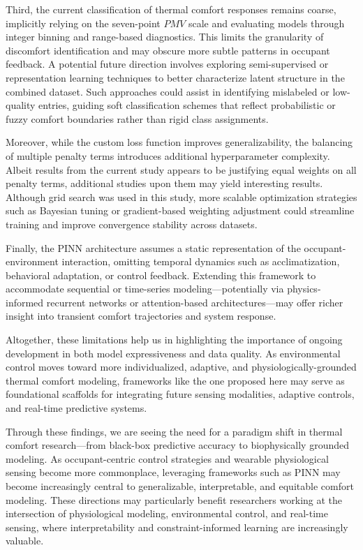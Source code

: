 Third, the current classification of thermal comfort responses remains coarse, implicitly relying on the seven-point $PMV$ scale and evaluating models through integer binning and range-based diagnostics. This limits the granularity of discomfort identification and may obscure more subtle patterns in occupant feedback. A potential future direction involves exploring semi-supervised or representation learning techniques to better characterize latent structure in the combined dataset. Such approaches could assist in identifying mislabeled or low-quality entries, guiding soft classification schemes that reflect probabilistic or fuzzy comfort boundaries rather than rigid class assignments.

Moreover, while the custom loss function improves generalizability, the balancing of multiple penalty terms introduces additional hyperparameter complexity. Albeit results from the current study appears to be justifying equal weights on all penalty terms, additional studies upon them may yield interesting results. Although grid search was used in this study, more scalable optimization strategies such as Bayesian tuning or gradient-based weighting adjustment could streamline training and improve convergence stability across datasets.

Finally, the PINN architecture assumes a static representation of the occupant-environment interaction, omitting temporal dynamics such as acclimatization, behavioral adaptation, or control feedback. Extending this framework to accommodate sequential or time-series modeling—potentially via physics-informed recurrent networks or attention-based architectures—may offer richer insight into transient comfort trajectories and system response.

Altogether, these limitations help us in highlighting the importance of ongoing development in both model expressiveness and data quality. As environmental control moves toward more individualized, adaptive, and physiologically-grounded thermal comfort modeling, frameworks like the one proposed here may serve as foundational scaffolds for integrating future sensing modalities, adaptive controls, and real-time predictive systems.

Through these findings, we are seeing the need for a paradigm shift in thermal comfort research—from black-box predictive accuracy to biophysically grounded modeling. As occupant-centric control strategies and wearable physiological sensing become more commonplace, leveraging frameworks such as PINN may become increasingly central to generalizable, interpretable, and equitable comfort modeling. These directions may particularly benefit researchers working at the intersection of physiological modeling, environmental control, and real-time sensing, where interpretability and constraint-informed learning are increasingly valuable.